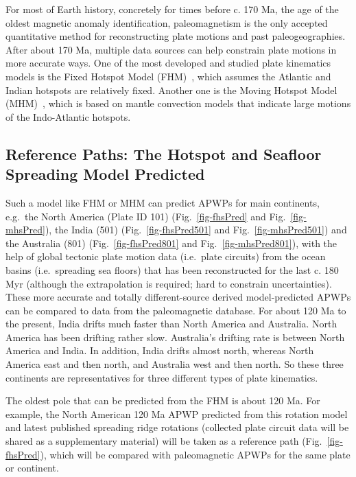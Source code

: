 For most of Earth history, concretely for times before c. 170 Ma, the age of the
oldest magnetic anomaly identification, paleomagnetism is the only accepted
quantitative method for reconstructing plate motions and past paleogeographies.
After about 170 Ma, multiple data sources can help constrain plate motions in
more accurate ways. One of the most developed and studied plate kinematics
models is the Fixed Hotspot Model (FHM)~\cite{M93,M99}, which assumes the
Atlantic and Indian hotspots are relatively fixed. Another one is the Moving
Hotspot Model (MHM)~\cite{O05}, which is based on mantle convection models that
indicate large motions of the Indo-Atlantic hotspots.

\subsection{Reference Paths: The Hotspot and Seafloor Spreading Model Predicted}

Such a model like FHM or MHM can predict APWPs for main continents, e.g.\ the
North America (Plate ID 101) (Fig.~\ref{fig-fhsPred} and
Fig.~\ref{fig-mhsPred}), the India (501) (Fig.~\ref{fig-fhsPred501} and
Fig.~\ref{fig-mhsPred501}) and the Australia (801) (Fig.~\ref{fig-fhsPred801}
and Fig.~\ref{fig-mhsPred801}), with the help of global tectonic plate motion
data (i.e.\ plate circuits) from the ocean basins (i.e.\ spreading sea floors)
that has been reconstructed for the last c. 180 Myr (although the
extrapolation is required; hard to constrain uncertainties). These more accurate
and totally different-source derived model-predicted APWPs can be compared to
data from the paleomagnetic database. For about 120 Ma to the present, India
drifts much faster than North America and Australia. North America has been
drifting rather slow. Australia's drifting rate is between North America and
India. In addition, India drifts almost north, whereas North America east and
then north, and Australia west and then north. So these three continents are
representatives for three different types of plate kinematics.

The oldest pole that can be predicted from the FHM is about 120 Ma. For example,
the North American 120 Ma APWP predicted from this rotation model
and latest published spreading ridge rotations (collected plate circuit data
will be shared as a supplementary material) will be taken as a reference path
(Fig.~\ref{fig-fhsPred}), which will be compared with paleomagnetic APWPs for
the same plate or continent.

